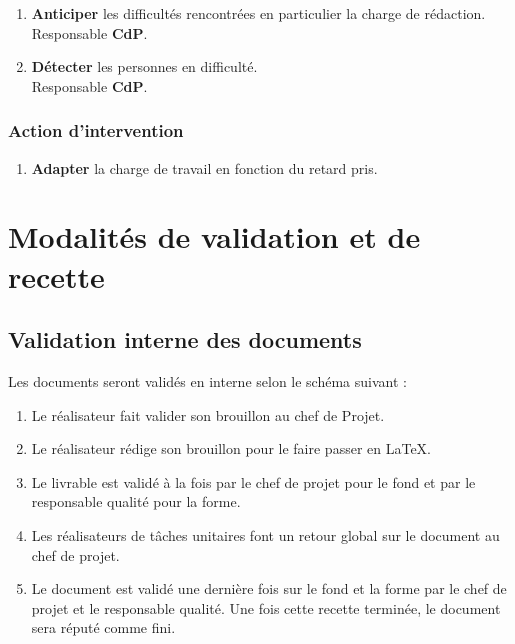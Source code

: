 \documentclass[twoside]{article}
\begin{document}
\begin{enumerate}
\item {\bf Anticiper} les difficultés rencontrées en particulier la charge de
rédaction. \\
Responsable {\bf CdP}.
\item {\bf Détecter} les personnes en difficulté. \\
Responsable {\bf CdP}.
\end{enumerate}

\subsubsection{Action d'intervention}

\begin{enumerate}
\item {\bf Adapter} la charge de travail en fonction du retard pris.
\end{enumerate}


\section{Modalités de validation et de recette}

\subsection{Validation interne des documents}

Les documents seront validés en interne selon le schéma suivant : 
\begin{enumerate}
\item Le réalisateur fait valider son brouillon au chef de Projet.
\item Le réalisateur rédige son brouillon pour le faire passer en \LaTeX.
\item Le livrable est validé à la fois par le chef de projet pour le fond et
    par le responsable qualité pour la forme.
\item Les réalisateurs de tâches unitaires font un retour global sur le document
    au chef de projet.
\item Le document est validé une dernière fois sur le fond et la forme par le
    chef de projet et le responsable qualité. Une fois cette recette terminée,
    le document sera réputé comme fini.
\end{enumerate} 
\end{document}
